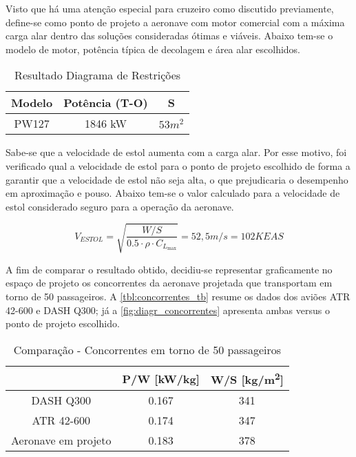 Visto que há uma atenção especial para cruzeiro como discutido previamente, define-se como ponto de projeto a aeronave com motor comercial com a máxima carga alar dentro das soluções consideradas ótimas e viáveis.
Abaixo tem-se o modelo de motor, potência típica de decolagem e área alar escolhidos. 

\begin{table}[H]
\centering
\begin{tabular}{ccc}
\toprule
Modelo & Potência (T-O) & S \\ \midrule
PW127 & 1846 kW & $53 m^2$  \\
\bottomrule
\end{tabular}
\caption[Resultado Diagrama de Restrições]{Resultado Diagrama de Restrições}
\label{tbl:resultado_DR}
\end{table}

Sabe-se que a velocidade de estol aumenta com a carga alar.
Por esse motivo, foi verificado qual a velocidade de estol para o ponto de projeto escolhido de forma a garantir que a velocidade de estol não seja alta, o que prejudicaria o desempenho em aproximação e pouso.
Abaixo tem-se o valor calculado para a velocidade de estol considerado seguro para a operação da aeronave.


\begin{equation}
V_{ESTOL} = \sqrt{ \frac
	{W/S}
    {0.5 \cdot \rho \cdot C_{L_{\max}}} 
} = \si{52,5}{m/s} = 102 \si{KEAS}
\end{equation}

A fim de comparar o resultado obtido, decidiu-se representar graficamente no espaço de projeto os concorrentes da aeronave projetada que transportam em torno de 50 passageiros.
A \autoref{tbl:concorrentes_tb} resume os dados dos aviões ATR 42-600 e DASH Q300;
já a \autoref{fig:diagr_concorrentes} apresenta ambas versus o ponto de projeto escolhido. 

\begin{table}[H]
\centering
\begin{tabular}{ccc}
\toprule
 & P/W [\si{kW/kg}] & W/S [\si{kg/m^2}] \\ \midrule
DASH Q300 & 0.167 & 341 \\
ATR 42-600 & 0.174 & 347 \\
Aeronave em projeto & 0.183 & 378 \\
\bottomrule
\end{tabular}
\caption[Comparação - Concorrentes em torno de 50 passageiros]{Comparação - Concorrentes em torno de 50 passageiros}
\label{tbl:concorrentes_tb}
\end{table}

